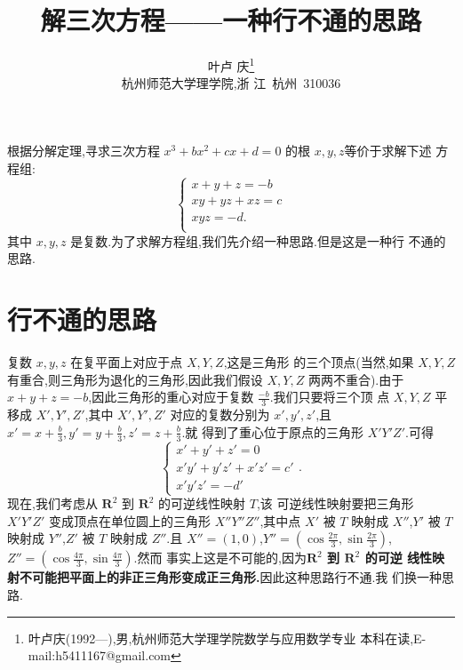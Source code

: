 \documentclass[a4paper]{article}
\begin{document}
\title{\huge{\bf{解三次方程——一种行不通的思路}}} \author{\small{叶卢
    庆\footnote{叶卢庆(1992---),男,杭州师范大学理学院数学与应用数学专业
      本科在读,E-mail:h5411167@gmail.com}}\\{\small{杭州师范大学理学院,浙
      江~杭州~310036}}}
\maketitle
根据分解定理,寻求三次方程 $x^3 + bx^2 + cx + d = 0$ 的根 $x,y,z$等价于求解下述
方程组:
$$
\begin{cases}
  x+y+z = -b\\
xy + yz + xz = c\\
xyz = -d.\\
\end{cases}
$$
其中 $x,y,z$ 是复数.为了求解方程组,我们先介绍一种思路.但是这是一种行
不通的思路.
\section{行不通的思路}
\label{sec:1}
复数 $x,y,z$ 在复平面上对应于点 $X,Y,Z$,这是三角形
的三个顶点(当然,如果 $X,Y,Z$ 有重合,则三角形为退化的三角形,因此我们假设 $X,Y,Z$ 两两不重合).由于
$x+y+z=-b$,因此三角形的重心对应于复数 $\frac{-b}{3}$.我们只要将三个顶
点 $X,Y,Z$ 平移成 $X',Y',Z'$,其中 $X',Y',Z'$ 对应的复数分别为
$x',y',z'$,且 $x'=x+\frac{b}{3},y'=y+\frac{b}{3},z'=z+\frac{b}{3}$.就
得到了重心位于原点的三角形 $X'Y'Z'$.可得
$$
\begin{cases}
  x'+y'+z'=0\\
x'y'+y'z'+x'z'=c'\\
x'y'z'=-d'
\end{cases}.
$$
现在,我们考虑从 $\mathbf{R}^2$ 到 $\mathbf{R}^2$ 的可逆线性映射 $T$,该
可逆线性映射要把三角形 $X'Y'Z'$ 变成顶点在单位圆上的三角形
$X''Y''Z''$,其中点 $X'$ 被 $T$ 映射成 $X''$,$Y'$ 被 $T$ 映射成 $Y''$,$Z'$
被 $T$ 映射成 $Z''$.且 $X''=(1,0)$,$Y''=(\cos \frac{2\pi}{3},\sin
\frac{2\pi}{3})$,$Z''=(\cos \frac{4\pi}{3},\sin \frac{4\pi}{3})$.然而
事实上这是不可能的,因为\textbf{$\mathbf{R}^2$ 到 $\mathbf{R}^2$ 的可逆
  线性映射不可能把平面上的非正三角形变成正三角形.}因此这种思路行不通.我
们换一种思路.
\end{document}
